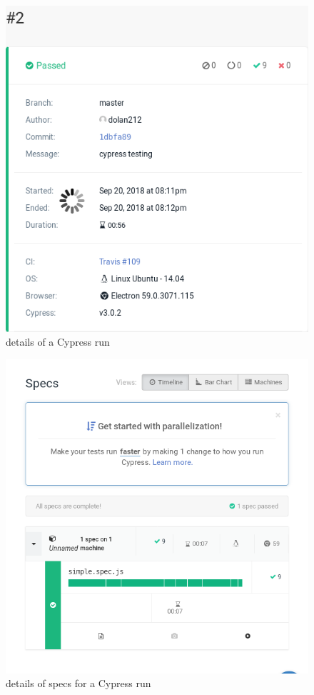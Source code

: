 \documentclass{article}
\begin{document}
\begin{figure}[h]
    \centering
    \includegraphics[width=\textwidth]{cypress_run_1}
    \caption{details of a Cypress run}
\end{figure}
\begin{figure}[h]
    \centering
    \includegraphics[width=\textwidth]{cypress_run_2}
    \caption{details of specs for a Cypress run}
\end{figure}
\end{document}
